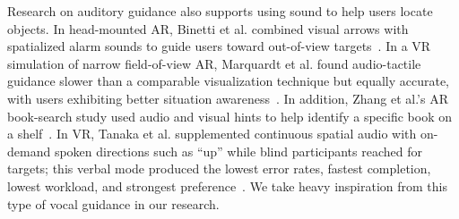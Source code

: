 Research on auditory guidance also supports using sound to help users locate objects. In head-mounted AR, Binetti et al. combined visual arrows with spatialized alarm sounds to guide users toward out-of-view targets~\cite{binetti2021outofview}. In a VR simulation of narrow field-of-view AR, Marquardt et al. found audio-tactile guidance slower than a comparable visualization technique but equally accurate, with users exhibiting better situation awareness~\cite{marquardt2020guidance}. In addition, Zhang et al.'s AR book-search study used audio and visual hints to help identify a specific book on a shelf~\cite{zhang2023seehear}. In VR, Tanaka et al. supplemented continuous spatial audio with on-demand spoken directions such as ``up'' while blind participants reached for targets; this verbal mode produced the lowest error rates, fastest completion, lowest workload, and strongest preference~\cite{tanaka2026coarse}. We take heavy inspiration from this type of vocal guidance in our research.
